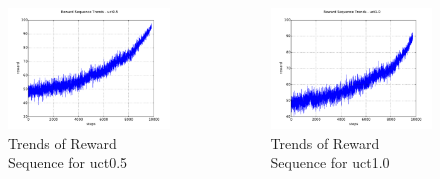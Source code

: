 \documentclass[compress]{beamer}
\begin{document}
\begin{frame}
\begin{columns}
\begin{figure}[htb!]
\centering
\includegraphics[width=1.0\textwidth]{trends_uct0_5.pdf}
\caption{\label{fig:trends_uct0.5}Trends of Reward Sequence for uct0.5}
\end{figure}
\begin{figure}[htb!]
\centering
\includegraphics[width=1.0\textwidth]{trends_uct1_0.pdf}
\caption{\label{fig:trends_uct1.0}Trends of Reward Sequence for uct1.0}
\end{figure}
\end{columns}
\end{frame}
\end{document}
